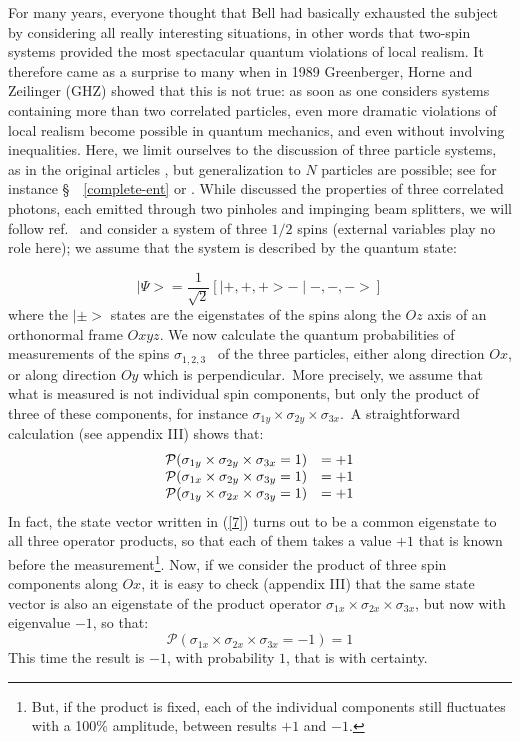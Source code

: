 \documentclass[12pt,onecolumn]{article}%
\begin{document}
For many years, everyone thought that Bell had basically exhausted the subject
by considering all really interesting situations, in other words that two-spin
systems provided the most spectacular quantum violations of local realism. It
therefore came as a surprise to many when in 1989 Greenberger, Horne and
Zeilinger (GHZ) showed that this is not true: as soon as one considers systems
containing more than two correlated particles, even more dramatic violations
of local realism become possible in quantum mechanics, and even without
involving inequalities. Here, we limit ourselves to the discussion of three
particle systems, as in the original articles \cite{GHZ} \cite{GHZ-bis}, but
generalization to $N$ particles are possible; see for instance
\S \ \ \ref{complete-ent} or \cite{FL2}. While \cite{GHZ-bis} discussed the
properties of three correlated photons, each emitted through two pinholes and
impinging beam splitters, we will follow ref.\ \cite{Mermin5} and consider a
system of three $1/2$ spins (external variables play no role here); we assume
that the system is described by the quantum state:%

\begin{equation}
\mid\Psi>=\frac{1}{\sqrt{2}}\left[  \mid+,+,+>-\mid-,-,->\right]  \label{7}%
\end{equation}
where the $\mid\pm>$ states are the eigenstates of the spins along the $Oz$
axis of an orthonormal frame $Oxyz$. We now calculate the quantum
probabilities of measurements of the spins $\sigma_{1,2,3}$ \ of the three
particles, either along direction $Ox$, or along direction $Oy$ which is
perpendicular.\ More precisely, we assume that what is measured is not
individual spin components, but only the product of three of these components,
for instance $\sigma_{1y}\times\sigma_{2y}\times\sigma_{3x}$.\ A
straightforward calculation (see appendix III) shows that:
\begin{equation}%
\begin{array}
[c]{ll}%
\mathcal{P}(\sigma_{1y}\times\sigma_{2y}\times\sigma_{3x}=1) & =+1\\
\mathcal{P}(\sigma_{1x}\times\sigma_{2y}\times\sigma_{3y}=1) & =+1\\
\mathcal{P}(\sigma_{1y}\times\sigma_{2x}\times\sigma_{3y}=1) & =+1
\end{array}
\label{8}%
\end{equation}
In fact, the state vector written in (\ref{7}) turns out to be a common
eigenstate to all three operator products, so that each of them takes a value
$+1$ that is known before the measurement\footnote{But, if the product is
fixed, each of the individual components still fluctuates with a 100\%
amplitude, between results $+1$ and $-1$.}. Now, if we consider the product of
three spin components along $Ox$, it is easy to check (appendix III) that the
same state vector is also an eigenstate of the product operator $\sigma
_{1x}\times\sigma_{2x}\times\sigma_{3x}$, but now with eigenvalue $-1$, so
that:
\begin{equation}
\mathcal{P}(\sigma_{1x}\times\sigma_{2x}\times\sigma_{3x}=-1)=1 \label{9}%
\end{equation}
This time the result is $-1$, with probability $1$, that is with certainty.
\end{document}
